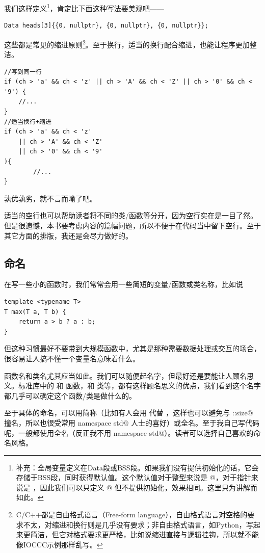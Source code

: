 我们这样定义\footnote{补充：全局变量定义在Data段或BSS段。如果我们没有提供初始化的话，它会存储于BSS段，同时获得默认值。这个默认值对于整型来说是 @，对于指针来说是 \lstinline@nullptr@，因此我们可以只定义 \lstinline@heads[3]@ 但不提供初始化，效果相同。这里只为讲解而如此。}，肯定比下面这种写法要美观吧——
\begin{lstlisting}
Data heads[3]{{0, nullptr}, {0, nullptr}, {0, nullptr}};
\end{lstlisting}\par
这些都是常见的缩进原则\footnote{C/C++都是自由格式语言（Free-form language），自由格式语言对空格的要求不太，对缩进和换行则是几乎没有要求；非自由格式语言，如Python，写起来更简洁，但它对格式要求更严格，比如说缩进直接与逻辑挂钩，所以就不能像IOCCC示例那样乱写。}。至于换行，适当的换行配合缩进，也能让程序更加整洁。
\begin{lstlisting}
//写到同一行
if (ch > 'a' && ch < 'z' || ch > 'A' && ch < 'Z' || ch > '0' && ch < '9') {
    //...
}
//适当换行+缩进
if (ch > 'a' && ch < 'z'
    || ch > 'A' && ch < 'Z'
    || ch > '0' && ch < '9'
){
        //...
}
\end{lstlisting}
孰优孰劣，就不言而喻了吧。\par
适当的空行也可以帮助读者将不同的类/函数等分开，因为空行实在是一目了然。但是很遗憾，本书要考虑内容的篇幅问题，所以不便于在代码当中留下空行。至于其它方面的排版，我还是会尽力做好的。\par
\subsection*{命名}
在写一些小的函数时，我们常常会用一些简短的变量/函数或类名称，比如说
\begin{lstlisting}
template <typename T>
T max(T a, T b) {
    return a > b ? a : b;
}
\end{lstlisting}
但这种习惯最好不要带到大规模函数中，尤其是那种需要数据处理或交互的场合，很容易让人搞不懂一个变量名意味着什么。\par
函数名和类名尤其应当如此。我们可以随便起名字，但最好还是要能让人顾名思义。标准库中的 \lstinline@max@ 和 \lstinline@strlen@ 函数，\lstinline@string@ 和 \lstinline@list@ 类等，都有这样顾名思义的优点，我们看到这个名字都几乎可以确定这个函数/类是做什么的。\par
至于具体的命名，可以用简称（比如有人会用 \lstinline@siz@ 代替 \lstinline@size@，这样也可以避免与 \lstinline@std::size@ 撞名，所以也很受常用 \lstinline@using namespace std@ 人士的喜好）或全名。至于我自己写代码呢，一般都使用全名（反正我不用 \lstinline@using namespace std@）。读者可以选择自己喜欢的命名风格。\par

